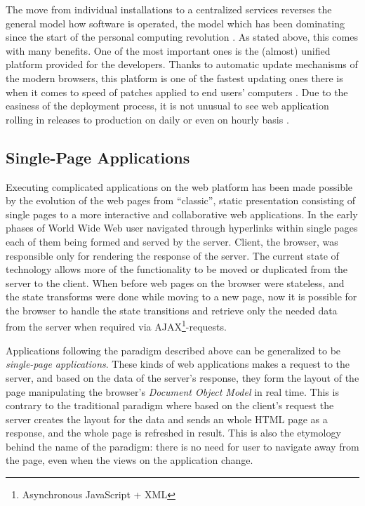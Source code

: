 The move from individual installations to a centralized services reverses the general model how software is operated, the model which has been dominating since the start of the personal computing revolution \cite[Chapter 3.3]{jazayeri_trends_????}. As stated above, this comes with many benefits. One of the most important ones is the (almost) unified platform provided for the developers. Thanks to automatic update mechanisms of the modern browsers, this platform is one of the fastest updating ones there is when it comes to speed of patches applied to end users' computers \cite{duebendorfer_why_2009}. Due to the easiness of the deployment process, it is not unusual to see web application rolling in releases to production on daily or even on hourly basis \cite[Chapter 3.3]{jazayeri_trends_????}.



\subsection{Single-Page Applications}
\label{subsec:spa}


Executing complicated applications on the web platform has been made possible by the evolution of the web pages from ``classic'', static presentation consisting of single pages to a more interactive and collaborative web applications. In the early phases of World Wide Web user navigated through hyperlinks within single pages each of them being formed and served by the server. Client, the browser, was responsible only for rendering the response of the server. \cite{taivalsaari_mashware:_2009} The current state of technology allows more of the functionality to be moved or duplicated from the server to the client. When before web pages on the browser were stateless, and the state transforms were done while moving to a new page, now it is possible for the browser to handle the state transitions and retrieve only the needed data from the server when required via AJAX\footnote{Asynchronous JavaScript + XML}-requests. \cite{paulson_building_2005}

Applications following the paradigm described above can be generalized to be \textit{single-page applications}. These kinds of web applications makes a request to the server, and based on the data of the server's response, they form the layout of the page manipulating the browser's \textit{Document Object Model} in real time. This is contrary to the traditional paradigm where based on the client's request the server creates the layout for the data and sends an whole HTML page as a response, and the whole page is refreshed in result. This is also the etymology behind the name of the paradigm: there is no need for user to navigate away from the page, even when the views on the application change.

